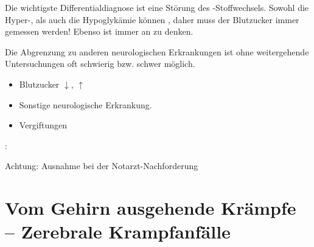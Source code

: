 {
Die wichtigste Differentialdiagnose ist eine Störung des
-Stoffwechsels. Sowohl die Hyper-, als auch
die Hypoglykämie können , daher
muss der Blutzucker immer gemessen werden!
Ebenso ist immer
an  zu denken.

Die Abgrenzung zu anderen neurologischen Erkrankungen ist
ohne weitergehende Untersuchungen oft schwierig bzw. schwer
möglich. 
}{
\begin{itemize}
  \item Blutzucker ${\downarrow}$, ${\uparrow}$
  \item Sonstige neurologische Erkrankung.
  \item Vergiftungen
\end{itemize}

}{}{}{}

{: 

Achtung: Ausnahme bei der Notarzt-Nachforderung
}{}


\section{Vom Gehirn ausgehende Krämpfe -- Zerebrale Krampfanfälle}
\label{topic:zerebrale-krampfanfaelle}
\label{topic:krampfanfall}




